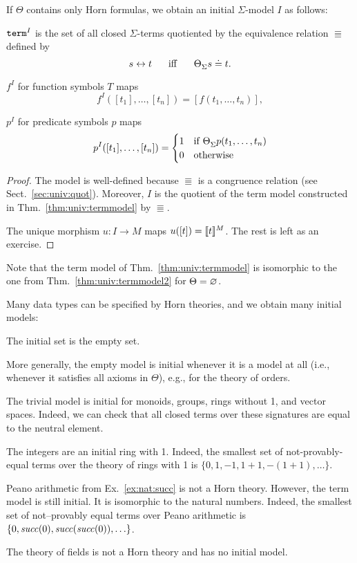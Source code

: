 \begin{theorem}\label{thm:univ:termmodel2}
If $\Theta$ contains only Horn formulas, we obtain an initial $\Sigma$-model $I$ as follows:
\begin{compactitem}
 \item $\mathtt{term}^I$ is the set of all closed $\Sigma$-terms quotiented by the equivalence relation $\Equiv$ defined by
   \[s\Equiv t  \tb\miff\tb \iscons{\Sigma}{}{\Theta}{s\doteq t}.\]
 \item $f^I$ for function symbols $T$ maps \[f^I([t_1],\ldots,[t_n])=[f(t_1,\ldots,t_n)],\]
 \item $p^I$ for predicate symbols $p$ maps \[p^I([t_1],\ldots,[t_n])=\cas{1\mifc \iscons{\Sigma}{}{\Theta}{p(t_1,\ldots,t_n)}\\0\mothw}\]
\end{compactitem}
\end{theorem}
\begin{proof}
The model is well-defined because $\Equiv$ is a congruence relation (see Sect.~\ref{sec:univ:quot}).
Moreover, $I$ is the quotient of the term model constructed in Thm.~\ref{thm:univ:termmodel} by $\Equiv$.

The unique morphism $u:I\to M$ maps $u([t])=\llbracket t\rrbracket^{M}$.
The rest is left as an exercise.
\end{proof}

Note that the term model of Thm.~\ref{thm:univ:termmodel} is isomorphic to the one from Thm.~\ref{thm:univ:termmodel2} for $\Theta=\varnothing$.

\begin{example}
Many data types can be specified by Horn theories, and we obtain many initial models:
\begin{compactitem}
\item The initial set is the empty set.
\item More generally, the empty model is initial whenever it is a model at all (i.e., whenever it satisfies all axioms in $\Theta$), e.g., for the theory of orders.
\item The trivial model is initial for monoids, groups, rings without 1, and vector spaces.
Indeed, we can check that all closed terms over these signatures are equal to the neutral element.
\item The integers are an initial ring with 1.
Indeed, the smallest set of not-provably-equal terms over the theory of rings with 1 is $\{0,1,-1,1+1,-(1+1),\ldots\}$.
\item Peano arithmetic from Ex.~\ref{ex:nat:succ} is not a Horn theory. However, the term model is still initial.
It is isomorphic to the natural numbers.
Indeed, the smallest set of not--provably equal terms over Peano arithmetic is $\{0,\mathit{succ}(0),\mathit{succ}(\mathit{succ}(0)),\ldots\}$.
\item The theory of fields is not a Horn theory and has no initial model.
\end{compactitem}
\end{example}

